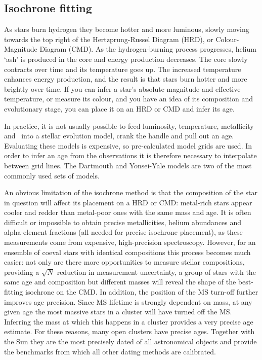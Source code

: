 \subsection{Isochrone fitting}

As stars burn hydrogen they become hotter and more luminous, slowly moving
towards the top right of the Hertzprung-Russel Diagram (HRD), or
Colour-Magnitude Diagram (CMD).
As the hydrogen-burning process progresses, helium `ash' is produced in the
core and energy production decreases.
The core slowly contracts over time and its temperature goes up.
The increased temperature enhances energy production, and the result is that
stars burn hotter and more brightly over time.
If you can infer a star's absolute magnitude and effective temperature, or
measure its colour, and you have an idea of its composition and evolutionary
stage, you can place it on an HRD or CMD and infer its age.

In practice, it is not usually possible to feed luminosity, temperature,
metallicity and \logg\ into a stellar evolution model, crank the handle and
pull out an age.
Evaluating these models is expensive, so pre-calculated model grids are used.
In order to infer an age from the observations it is therefore necessary to
interpolate between grid lines.
The Dartmouth \citep{dotter} and Yonsei-Yale \citep{spada} models are two of
the most commonly used sets of models.

An obvious limitation of the isochrone method is that the composition of the
star in question will affect its placement on a HRD or CMD: metal-rich stars
appear cooler and redder than metal-poor ones with the same mass and age.
It is often difficult or impossible to obtain precise metallicities, helium
abundances and alpha-element fractions (all needed for precise isochrone
placement), as these measurements come from expensive, high-precision
spectroscopy.
However, for an ensemble of coeval stars with identical compositions this
process becomes much easier: not only are there more opportunities to measure
stellar compositions, providing a $\sqrt N$ reduction in measurement
uncertainty, a group of stars with the same age and composition but different
masses will reveal the shape of the best-fitting isochrone on the CMD\@.
In addition, the position of the MS turn-off further improves age precision.
Since MS lifetime is strongly dependent on mass, at any given age the most
massive stars in a cluster will have turned off the MS.
Inferring the mass at which this happens in a cluster provides a very precise
age estimate.
For these reasons, many open clusters have precise ages.
Together with the Sun they are the most precisely dated of all astronomical
objects and provide the benchmarks from which all other dating methods are
calibrated.

